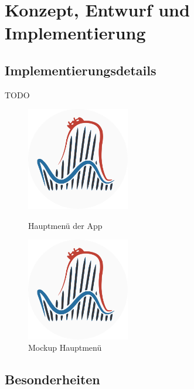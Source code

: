 \chapter{Konzept, Entwurf und Implementierung}
\label{cha:implementierung}

\section{Implementierungsdetails}
\label{sec:implementierung:implementierungsdetails}

TODO

\begin{figure}[h]
    \centering
    \begin{minipage}{0.49\textwidth}
        \centering
        \includegraphics[width=0.4\textwidth]{img/coaster42_logo.png}
        \caption{Hauptmenü der App}
		\label{figure:implementierungmenue}
    \end{minipage}
    \begin{minipage}{0.49\textwidth}
        \centering
        \includegraphics[width=0.4\textwidth]{img/coaster42_logo.png}
        \caption{Mockup Hauptmenü}
    \end{minipage}
\end{figure}



\section{Besonderheiten}
\label{sec:implementierung:besonderheiten}


